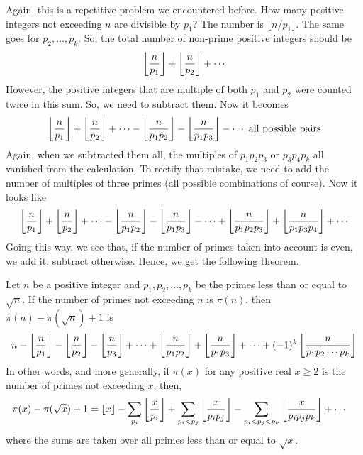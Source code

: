 	Again, this is a repetitive problem we encountered before. How many positive integers not exceeding $n$ are divisible by $p_1$? The number is $\lfloor {n}/{p_1}\rfloor$. The same goes for $p_2,\ldots,p_k$. So, the total number of non-prime positive integers should be
		\begin{align*}
			\left\lfloor{\frac{n}{p_1}}\right\rfloor+\left\lfloor{\frac{n}{p_2}}\right\rfloor+\cdots
		\end{align*}
	However, the positive integers that are multiple of both $p_1$ and $p_2$ were counted twice in this sum. So, we need to subtract them. Now it becomes
		\begin{align*}
			\left\lfloor{\frac{n}{p_1}}\right\rfloor+\left\lfloor{\frac{n}{p_2}}\right\rfloor+\cdots-\left\lfloor{\frac{n}{p_1p_2}}\right\rfloor-\left\lfloor{\frac{n}{p_1p_3}}\right\rfloor-\cdots \mbox{ all possible pairs}
		\end{align*}
	Again, when we subtracted them all, the multiples of $p_1p_2p_3$ or $p_3p_4p_k$ all vanished from the calculation. To rectify that mistake, we need to add the number of multiples of three primes (all possible combinations of course). Now it looks like
		\begin{align*}
			\left\lfloor{\frac{n}{p_1}}\right\rfloor+\left\lfloor{\frac{n}{p_2}}\right\rfloor+\cdots-\left\lfloor{\frac{n}{p_1p_2}}\right\rfloor-\left\lfloor{\frac{n}{p_1p_3}}\right\rfloor-\cdots+\left\lfloor{\frac{n}{p_1p_2p_3}}\right\rfloor+\left\lfloor{\frac{n}{p_1p_3p_4}}\right\rfloor+\cdots
		\end{align*}
	Going this way, we see that, if the number of primes taken into account is even, we add it, subtract otherwise. Hence, we get the following theorem.
		\begin{theorem}\label{thm:numofprime}
Let $n$ be a positive integer and $p_1,p_2,\ldots,p_k$ be the primes less than or equal to $\sqrt{n}$. If the number of primes not exceeding $n$ is $\pi(n)$, then $\pi(n) -\pi(\sqrt{n})+1$ is
\begin{align}
	n-\left\lfloor{\frac{n}{p_1}}\right\rfloor-\left\lfloor{\frac{n}{p_2}}\right\rfloor-\left\lfloor{\frac{n}{p_3}}\right\rfloor+\cdots+\left\lfloor{\frac{n}{p_1p_2}}\right\rfloor+\left\lfloor{\frac{n}{p_1p_3}}\right\rfloor+\cdots+(-1)^{k}\left\lfloor{\frac{n}{p_1p_2\cdots p_k}}\right\rfloor \label{eq:tau(n)-tau(sqrt(n))+1}
\end{align}
In other words, and more generally, if $\pi(x)$ for any positive real $x \geq 2$ is the number of primes not exceeding $x$, then,
\begin{align}
	\pi(x) -\pi(\sqrt{x})+1
		& = \left\lfloor{x}\right\rfloor - \sum_{p_i}\left\lfloor{\frac{x}{p_i}}\right\rfloor+ \sum_{p_i < p_j}\left\lfloor{\frac{x}{p_ip_j}}\right\rfloor- \sum_{p_i < p_j < p_k}\left\lfloor{\frac{x}{p_ip_jp_k}}\right\rfloor+ \cdots
\end{align}
where the sums are taken over all primes less than or equal to $\sqrt x$.
\end{theorem}

